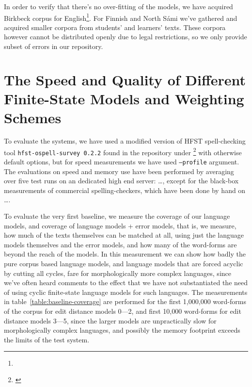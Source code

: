 \documentclass[a4paper,12pt]{article}
\begin{document}
In order to verify that there's no over-fitting of the models, we have acquired
Birkbeck corpus for English\footnote{}. For Finnish and North Sámi
we've gathered and acquired smaller corpora from students' and learners' texts.
These corpora however cannot be distributed openly due to legal restrictions,
so we only provide subset of errors in our repository.

\section{The Speed and Quality of Different Finite-State Models and Weighting
Schemes}
\label{sec:evaluation}

To evaluate the systems, we have used a modified version of HFST spell-checking
tool \texttt{hfst-ospell-survey 0.2.2} found in the repository under
\footnote{\url{}} with otherwise default
options, but for speed measurements we have used \texttt{--profile} argument.
The evaluations on speed and memory use have been performed by averaging over
five test runs on an dedicated high end server: \ldots, except for the
black-box measurements of commercial spelling-checkers, which have been done by
hand on \ldots.

To evaluate the very first baseline, we measure the coverage of our language
models, and coverage of language models + error models, that is, we measure,
how much of the texts themselves can be matched at all, using just the language
models themselves and the error models, and how many of the word-forms are
beyond the reach of the models. In this measurement we can show how badly the
pure corpus based language models, and language models that are forced acyclic
by cutting all cycles, fare for morphologically more complex languages, since
we've often heard comments to the effect that we have not substantiated the
need of using cyclic finite-state language models for such languages. The
measurements in table~\ref{table:baseline-coverage} are performed for the
first 1,000,000 word-forms of the corpus for edit distance models 0---2, and
first 10,000 word-forms for edit distance models 3---5, since the larger
models are unpractically slow for morphologically complex languages, and
possibly the memory footprint exceeds the limits of the test system.
\end{document}
